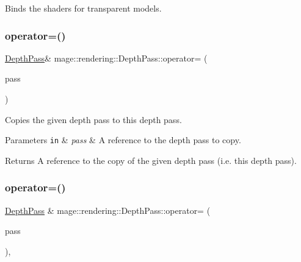 Binds the shaders for transparent models. \hypertarget{classmage_1_1rendering_1_1_depth_pass_a10cc86e94eb5425f0323b989c33514b7}{}\label{classmage_1_1rendering_1_1_depth_pass_a10cc86e94eb5425f0323b989c33514b7} 
\subsubsection{\texorpdfstring{operator=()}{operator=()}\hspace{0.1cm}{\footnotesize\ttfamily [1/2]}}
{\footnotesize\ttfamily \hyperlink{classmage_1_1rendering_1_1_depth_pass}{Depth\+Pass}\& mage\+::rendering\+::\+Depth\+Pass\+::operator= (\begin{DoxyParamCaption}\item[{const \hyperlink{classmage_1_1rendering_1_1_depth_pass}{Depth\+Pass} \&}]{pass }\end{DoxyParamCaption})\hspace{0.3cm}{\ttfamily [delete]}}

Copies the given depth pass to this depth pass.


\begin{DoxyParams}[1]{Parameters}
\mbox{\tt in}  & {\em pass} & A reference to the depth pass to copy. \\
\hline
\end{DoxyParams}
\begin{DoxyReturn}{Returns}
A reference to the copy of the given depth pass (i.\+e. this depth pass). 
\end{DoxyReturn}
\hypertarget{classmage_1_1rendering_1_1_depth_pass_a937bc6669a2bd856e7ff9c396e0afe77}{}\label{classmage_1_1rendering_1_1_depth_pass_a937bc6669a2bd856e7ff9c396e0afe77} 
\subsubsection{\texorpdfstring{operator=()}{operator=()}\hspace{0.1cm}{\footnotesize\ttfamily [2/2]}}
{\footnotesize\ttfamily \hyperlink{classmage_1_1rendering_1_1_depth_pass}{Depth\+Pass} \& mage\+::rendering\+::\+Depth\+Pass\+::operator= (\begin{DoxyParamCaption}\item[{\hyperlink{classmage_1_1rendering_1_1_depth_pass}{Depth\+Pass} \&\&}]{pass }\end{DoxyParamCaption})\hspace{0.3cm}{\ttfamily [default]}, {\ttfamily [noexcept]}}

